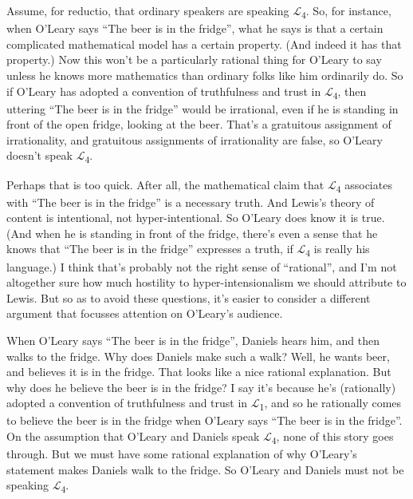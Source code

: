 \documentclass[
  11pt,
  letterpaper,
  DIV=11,
  numbers=noendperiod,
  twoside]{scrartcl}
\begin{document}
Assume, for reductio, that ordinary speakers are speaking
\(\mathcal{L}\)\textsubscript{4}. So, for instance, when O'Leary says
``The beer is in the fridge'', what he says is that a certain
complicated mathematical model has a certain property. (And indeed it
has that property.) Now this won't be a particularly rational thing for
O'Leary to say unless he knows more mathematics than ordinary folks like
him ordinarily do. So if O'Leary has adopted a convention of
truthfulness and trust in \(\mathcal{L}\)\textsubscript{4}, then
uttering ``The beer is in the fridge'' would be irrational, even if he
is standing in front of the open fridge, looking at the beer. That's a
gratuitous assignment of irrationality, and gratuitous assignments of
irrationality are false, so O'Leary doesn't speak
\(\mathcal{L}\)\textsubscript{4}.

Perhaps that is too quick. After all, the mathematical claim that
\(\mathcal{L}\)\textsubscript{4} associates with ``The beer is in the
fridge'' is a necessary truth. And Lewis's theory of content is
intentional, not hyper-intentional. So O'Leary does know it is true.
(And when he is standing in front of the fridge, there's even a sense
that he knows that ``The beer is in the fridge'' expresses a truth, if
\(\mathcal{L}\)\textsubscript{4} is really his language.) I think that's
probably not the right sense of ``rational'', and I'm not altogether
sure how much hostility to hyper-intensionalism we should attribute to
Lewis. But so as to avoid these questions, it's easier to consider a
different argument that focusses attention on O'Leary's audience.

When O'Leary says ``The beer is in the fridge'', Daniels hears him, and
then walks to the fridge. Why does Daniels make such a walk? Well, he
wants beer, and believes it is in the fridge. That looks like a nice
rational explanation. But why does he believe the beer is in the fridge?
I say it's because he's (rationally) adopted a convention of
truthfulness and trust in \(\mathcal{L}\)\textsubscript{1}, and so he
rationally comes to believe the beer is in the fridge when O'Leary says
``The beer is in the fridge''. On the assumption that O'Leary and
Daniels speak \(\mathcal{L}\)\textsubscript{4}, none of this story goes
through. But we must have some rational explanation of why O'Leary's
statement makes Daniels walk to the fridge. So O'Leary and Daniels must
not be speaking \(\mathcal{L}\)\textsubscript{4}.
\end{document}
